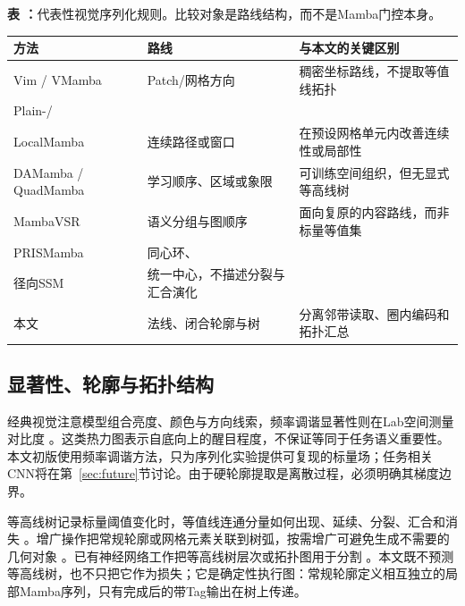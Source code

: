 \begin{center}
\label{tab:comparison}
\begin{minipage}{\columnwidth}
\small\textbf{表 \thetable：}代表性视觉序列化规则。比较对象是路线结构，而不是Mamba门控本身。

\vspace{2pt}
\fontsize{7.3pt}{8.0pt}\selectfont
\setlength{\tabcolsep}{2pt}
\begin{tabular}{@{}>{\raggedright\arraybackslash}p{}>{\raggedright\arraybackslash}p{}>{\raggedright\arraybackslash}p{}@{}}
\toprule
方法 & 路线 & 与本文的关键区别 \\
\midrule
Vim / VMamba & Patch/网格方向 & 稠密坐标路线，不提取等值线拓扑 \\
Plain-/\\LocalMamba & 连续路径或窗口 & 在预设网格单元内改善连续性或局部性 \\
DAMamba / QuadMamba & 学习顺序、区域或象限 & 可训练空间组织，但无显式等高线树 \\
MambaVSR & 语义分组与图顺序 & 面向复原的内容路线，而非标量等值集 \\
PRISMamba & 同心环、\\径向SSM & 统一中心，不描述分裂与汇合演化 \\
本文 & 法线、闭合轮廓与树 & 分离邻带读取、圈内编码和拓扑汇总 \\
\bottomrule
\end{tabular}
\end{minipage}
\end{center}

\subsection{显著性、轮廓与拓扑结构}

经典视觉注意模型组合亮度、颜色与方向线索，频率调谐显著性则在Lab空间测量对比度 \cite{itti1998saliency,achanta2009frequency}。这类热力图表示自底向上的醒目程度，不保证等同于任务语义重要性。本文初版使用频率调谐方法，只为序列化实验提供可复现的标量场；任务相关CNN将在第~\ref{sec:future}节讨论。由于硬轮廓提取是离散过程，必须明确其梯度边界。

等高线树记录标量阈值变化时，等值线连通分量如何出现、延续、分裂、汇合和消失 \cite{carr2003contourtrees}。增广操作把常规轮廓或网格元素关联到树弧，按需增广可避免生成不需要的几何对象 \cite{sharma2018augmentation,gueunet2019augmented}。已有神经网络工作把等高线树层次或拓扑图用于分割 \cite{he2020contourtreegnn,adame2025topovmunet}。本文既不预测等高线树，也不只把它作为损失；它是确定性执行图：常规轮廓定义相互独立的局部Mamba序列，只有完成后的带Tag输出在树上传递。

